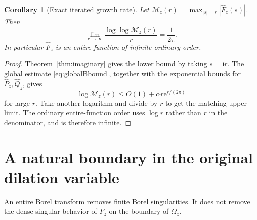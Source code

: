 \documentclass[11pt,a4paper]{article}
\numberwithin{equation}{section}
\newtheorem{corollary}[theorem]{Corollary}
\theoremstyle{definition}
\theoremstyle{remark}
\newcommand{\ii}{\mathrm i}
\newcommand{\e}{\mathrm e}
\begin{document}
\begin{corollary}[Exact iterated growth rate]
\label{cor:maxgrowth}
Let $\mathcal M_z(r)=\max_{|s|=r}|\widehat F_z(s)|$. Then
\begin{equation}
 \lim_{r\to\infty}\frac{\log\log\mathcal M_z(r)}r=\frac1{2\pi}.
 \label{eq:entiregrowth}
\end{equation}
In particular $\widehat F_z$ is an entire function of infinite ordinary order.
\end{corollary}
\begin{proof}
Theorem~\ref{thm:imaginary} gives the lower bound by taking $s=\ii r$. The global estimate \eqref{eq:globalBbound}, together with the exponential bounds for $\widehat P_z,\widehat Q_z$, gives
\[
 \log\mathcal M_z(r)\le O(1)+\alpha r\e^{r/(2\pi)}
\]
for large $r$. Take another logarithm and divide by $r$ to get the matching upper limit. The ordinary entire-function order uses $\log r$ rather than $r$ in the denominator, and is therefore infinite.
\end{proof}

\section{A natural boundary in the original dilation variable}
\label{sec:boundary}

An entire Borel transform removes finite Borel singularities. It does not remove the dense singular behavior of $F_z$ on the boundary of $\Omega_z$.
\end{document}
